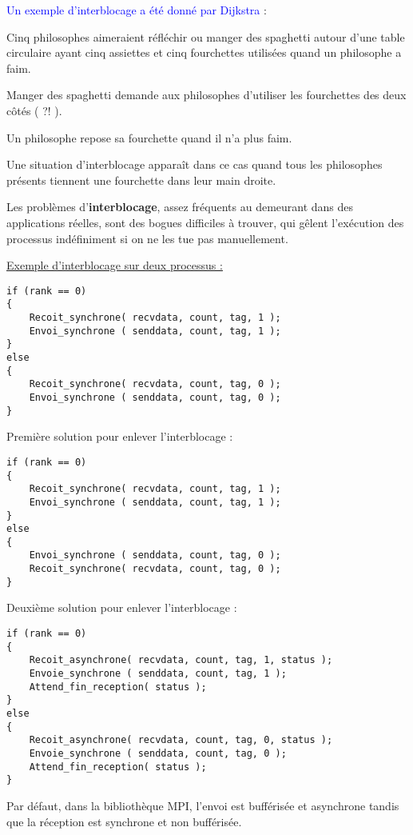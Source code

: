 \documentclass[fleqn,11pt]{article}
\begin{document}
\textcolor{blue}{Un exemple d'interblocage a été donné par Dijkstra} : 

\begin{framed}
Cinq philosophes aimeraient
réfléchir ou manger des spaghetti autour d'une table circulaire ayant cinq
assiettes et cinq fourchettes utilisées quand un philosophe a faim. 

Manger des spaghetti demande aux philosophes
d'utiliser les fourchettes des deux côtés ( ?! ). 

Un philosophe repose sa
fourchette quand il n'a plus faim. 

Une situation d'interblocage apparaît
dans ce cas quand tous les philosophes présents tiennent une fourchette dans
leur main droite.
\end{framed}

Les problèmes d'\textbf{interblocage}, assez fréquents au demeurant dans des
applications réelles, sont des bogues difficiles à trouver, qui gêlent
l'exécution des processus indéfiniment si on ne les tue pas manuellement.

\underline{Exemple d'interblocage sur deux processus :}

\begin{lstlisting}
if (rank == 0)
{
    Recoit_synchrone( recvdata, count, tag, 1 );
    Envoi_synchrone ( senddata, count, tag, 1 );
}
else
{
    Recoit_synchrone( recvdata, count, tag, 0 );
    Envoi_synchrone ( senddata, count, tag, 0 );
}
\end{lstlisting}

Première solution pour enlever l'interblocage :
\begin{lstlisting}
if (rank == 0)
{
    Recoit_synchrone( recvdata, count, tag, 1 );
    Envoi_synchrone ( senddata, count, tag, 1 );
}
else
{
    Envoi_synchrone ( senddata, count, tag, 0 );
    Recoit_synchrone( recvdata, count, tag, 0 );
}
\end{lstlisting}

Deuxième solution pour enlever l'interblocage :
\begin{lstlisting}
if (rank == 0)
{
    Recoit_asynchrone( recvdata, count, tag, 1, status );
    Envoie_synchrone ( senddata, count, tag, 1 );
    Attend_fin_reception( status );
}
else
{
    Recoit_asynchrone( recvdata, count, tag, 0, status );
    Envoie_synchrone ( senddata, count, tag, 0 );
    Attend_fin_reception( status );
}
\end{lstlisting}

Par défaut, dans la bibliothèque MPI, l'envoi est bufférisée et asynchrone tandis que la réception est
synchrone et non bufférisée.
\end{document}
